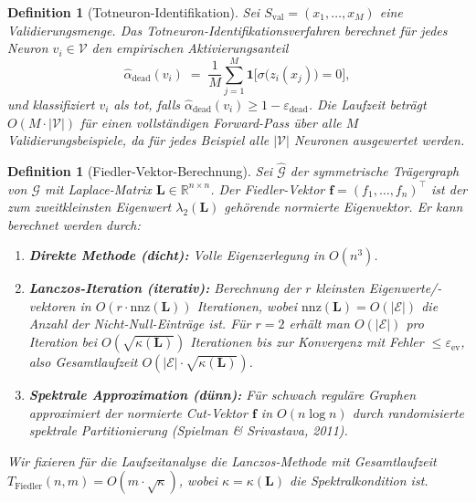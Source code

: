 ﻿\documentclass[12pt, a4paper, openany]{report}
\newtheorem{definition}[theorem]{Definition}
\newcommand{\R}{\mathbb{R}}
\newcommand{\calG}{\mathcal{G}}
\newcommand{\calV}{\mathcal{V}}
\newcommand{\calE}{\mathcal{E}}
\newcommand{\eps}{\varepsilon}
\begin{document}
\begin{definition}[Totneuron-Identifikation]
\label{def:dead_identification}
Sei $S_{\mathrm{val}} = (x_1, \ldots, x_M)$ eine Validierungsmenge.
Das \emph{Totneuron-Identifikationsverfahren} berechnet für jedes Neuron
$v_i \in \calV$ den empirischen Aktivierungsanteil
\begin{equation}
  \label{eq:dead_rate}
  \hat{\alpha}_{\mathrm{dead}}(v_i)
  \;=\;
  \frac{1}{M}\sum_{j=1}^{M}
  \mathbf{1}\!\bigl[\sigma\bigl(z_i(x_j)\bigr) = 0\bigr],
\end{equation}
und klassifiziert $v_i$ als tot, falls $\hat{\alpha}_{\mathrm{dead}}(v_i) \geq 1 - \eps_{\mathrm{dead}}$.
Die Laufzeit beträgt $O(M \cdot |\calV|)$ für einen vollständigen Forward-Pass
über alle $M$ Validierungsbeispiele, da für jedes Beispiel alle $|\calV|$ Neuronen
ausgewertet werden.
\end{definition}

\begin{definition}[Fiedler-Vektor-Berechnung]
\label{def:fiedler_computation}
Sei $\hat{\calG}$ der symmetrische Trägergraph von $\calG$ mit
Laplace-Matrix $\bm{L} \in \R^{n \times n}$.  Der
\emph{Fiedler-Vektor} $\bm{f} = (f_1, \ldots, f_n)^\top$ ist der zum
zweitkleinsten Eigenwert $\lambda_2(\bm{L})$ gehörende normierte Eigenvektor.
Er kann berechnet werden durch:
\begin{enumerate}[label=(\roman*)]
  \item \textbf{Direkte Methode (dicht):} Volle Eigenzerlegung in $O(n^3)$.
  \item \textbf{Lanczos-Iteration (iterativ):} Berechnung der $r$ kleinsten
        Eigenwerte/-vektoren in $O(r \cdot \mathrm{nnz}(\bm{L}))$
        Iterationen, wobei $\mathrm{nnz}(\bm{L}) = O(|\calE|)$ die Anzahl
        der Nicht-Null-Einträge ist.  Für $r = 2$ erhält man
        $O(|\calE|)$ pro Iteration bei $O(\sqrt{\kappa(\bm{L})})$
        Iterationen bis zur Konvergenz mit Fehler $\leq \eps_{\mathrm{ev}}$, also
        Gesamtlaufzeit $O(|\calE| \cdot \sqrt{\kappa(\bm{L})})$.
  \item \textbf{Spektrale Approximation (dünn):} Für schwach reguläre
        Graphen approximiert der normierte Cut-Vektor $\bm{f}$ in
        $O(n \log n)$ durch randomisierte spektrale Partitionierung
        (Spielman \& Srivastava, 2011).
\end{enumerate}
Wir fixieren für die Laufzeitanalyse die Lanczos-Methode mit
Gesamtlaufzeit $T_{\mathrm{Fiedler}}(n, m) = O(m \cdot \sqrt{\kappa})$,
wobei $\kappa = \kappa(\bm{L})$ die Spektralkondition ist.
\end{definition}
\end{document}
